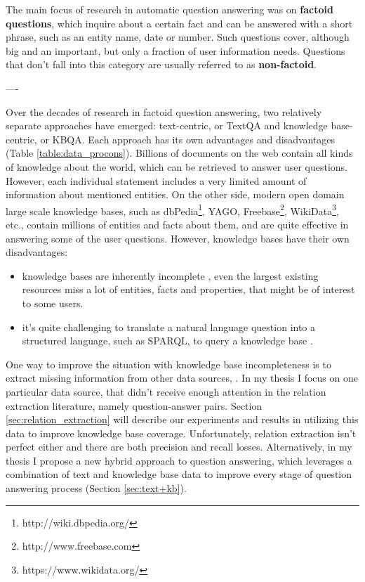 The main focus of research in automatic question answering was on \textbf{factoid questions}, which inquire about a certain fact and can be answered with a short phrase, such as an entity name, date or number.
Such questions cover, although big and an important, but only a fraction of user information needs.
Questions that don't fall into this category are usually referred to as \textbf{non-factoid}.

----

Over the decades of research in factoid question answering, two relatively separate approaches have emerged: text-centric, or TextQA and knowledge base-centric, or KBQA.
Each approach has its own advantages and disadvantages (Table \ref{table:data_procons}).
Billions of documents on the web contain all kinds of knowledge about the world, which can be retrieved to answer user questions.
However, each individual statement includes a very limited amount of information about mentioned entities.
On the other side, modern open domain large scale knowledge bases, such as dbPedia\footnote{http://wiki.dbpedia.org/}, YAGO\cite{yago3}, Freebase\footnote{http://www.freebase.com}, WikiData\footnote{https://www.wikidata.org/}, etc., contain millions of entities and facts about them, and are quite effective in answering some of the user questions.
However, knowledge bases have their own disadvantages:
\begin{itemize}
\item knowledge bases are inherently incomplete \cite{Dong:2014:KVW:2623330.2623623}, even the largest existing resources miss a lot of entities, facts and properties, that might be of interest to some users.
\item it's quite challenging to translate a natural language question into a structured language, such as SPARQL, to query a knowledge base \cite{BerantCFL13:sempre}.
\end{itemize}

One way to improve the situation with knowledge base incompleteness is to extract missing information from other data sources, \eg \cite{Cafarella:2008:WEP:1453856.1453916,Cafarella:2009:WES:1519103.1519112,Dong:2014:KVW:2623330.2623623,Etzioni:2008:OIE:1409360.1409378,Gupta:2014:BOS:2732286.2732288,kushmerick1997wrapper}.
In my thesis I focus on one particular data source, that didn't receive enough attention in the relation extraction literature, namely question-answer pairs.
Section \ref{sec:relation_extraction} will describe our experiments and results in utilizing this data to improve knowledge base coverage.
Unfortunately, relation extraction isn't perfect either and there are both precision and recall losses.
Alternatively, in my thesis I propose a new hybrid approach to question answering, which leverages a combination of text and knowledge base data to improve every stage of question answering process (Section \ref{sec:text+kb}).

